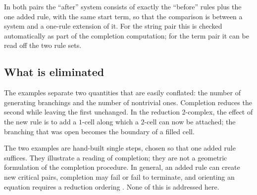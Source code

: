In both pairs the ``after'' system consists of exactly the ``before'' rules plus the one added rule, with the same start term, so that the comparison is between a system and a one-rule extension of it. For the string pair this is checked automatically as part of the completion computation; for the term pair it can be read off the two rule sets.

\subsection{What is eliminated}
\label{subsec:what-is-eliminated}

The examples separate two quantities that are easily conflated: the number of generating branchings and the number of nontrivial ones. Completion reduces the second while leaving the first unchanged. In the reduction 2-complex, the effect of the new rule is to add a $1$-cell along which a $2$-cell can now be attached; the branching that was open becomes the boundary of a filled cell.

\begin{remark}[Scope]
\label{rem:completion-boundary}
The two examples are hand-built single steps, chosen so that one added rule suffices. They illustrate a reading of completion; they are not a geometric formulation of the completion procedure. In general, an added rule can create new critical pairs, completion may fail or fail to terminate, and orienting an equation requires a reduction ordering \cite{KnuthBendix1970,BaaderNipkow1998}. None of this is addressed here.
\end{remark}

